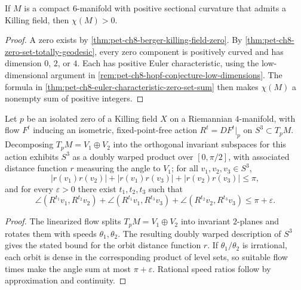 \begin{corollary}
  \label{cor:pet-ch8-positive-euler-characteristic-6manifold}

  If $M$ is a compact $6$-manifold with positive sectional curvature that
  admits a Killing field, then $\chi(M)>0$.
\end{corollary}
\begin{proof}
  \sketch
  A zero exists by \cref{thm:pet-ch8-berger-killing-field-zero}. By
  \cref{thm:pet-ch8-zero-set-totally-geodesic}, every zero component is
  positively curved and has dimension \(0\), \(2\), or \(4\). Each has positive
  Euler characteristic, using the low-dimensional argument in
  \cref{rem:pet-ch8-hopf-conjecture-low-dimensions}. The formula in
  \cref{thm:pet-ch8-euler-characteristic-zero-set-sum} then makes
  \(\chi(M)\) a nonempty sum of positive integers.
\end{proof}

\begin{lemma}
  \label{lem:pet-ch8-isolated-zero-orbit-angle-bound}

  Let $p$ be an isolated zero of a Killing field $X$ on a Riemannian
  $4$-manifold, with flow $F^t$ inducing an isometric, fixed-point-free action
  $R^t=DF^t|_p$ on $S^3\subset T_pM$. Decomposing $T_pM=V_1\oplus V_2$ into the
  orthogonal invariant subspaces for this action exhibits $S^3$ as a doubly
  warped product over $[0,\pi/2]$, with associated distance function $r$
  measuring the angle to $V_1$; for all $v_1,v_2,v_3\in S^3$,
  \[
    \lvert r(v_1)r(v_2)\rvert+\lvert r(v_1)r(v_3)\rvert
    +\lvert r(v_2)r(v_3)\rvert\le\pi,
  \]
  and for every $\varepsilon>0$ there exist $t_1,t_2,t_3$ such that
  \[
    \angle(R^{t_1}v_1,R^{t_2}v_2)+\angle(R^{t_1}v_1,R^{t_3}v_3)+\angle(R^{t_2}v_2,R^{t_3}v_3)\le\pi+\varepsilon.
  \]
\end{lemma}
\begin{proof}
  \sketch
  The linearized flow splits \(T_pM=V_1\oplus V_2\) into invariant
  \(2\)-planes and rotates them with speeds \(\theta_1,\theta_2\). The resulting
  doubly warped description of \(S^3\) gives the stated bound for the orbit
  distance function \(r\). If \(\theta_1/\theta_2\) is irrational, each orbit
  is dense in the corresponding product of level sets, so suitable flow times
  make the angle sum at most \(\pi+\varepsilon\). Rational speed ratios follow
  by approximation and continuity.
\end{proof}

